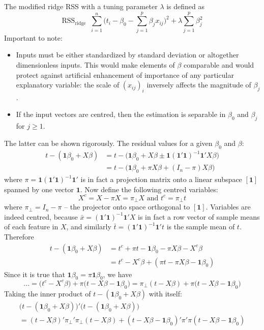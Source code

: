 \documentclass[a4paper]{article}
\newcommand{\RSS}{\text{RSS}}
\newcommand{\one}{\mathbf{1}}
\newcommand{\defn}{\mathop{\overset{\Delta}{=}}\nolimits}
\begin{document}
The modified ridge RSS with a tuning parameter $\lambda$ is defined as
\[
\RSS_\text{ridge}
\defn \sum_{i=1}^n \bigl( t_i - \beta_0 - \sum_{j=1}^p \beta_j x_{ij} \bigr)^2
	+ \lambda \sum_{j=1}^p \beta_j^2
\]
Important to note: \begin{itemize}
	\item Inputs must be either standardized by standard deviation or altogether
	dimensionless inputs. This would make elements of $\beta$ comparable and would
	protect against artificial enhancement of importance of any particular explanatory
	variable: the scale of $(x_{ij})_i$ inversely affects the magnitude of $\beta_j$.
	\item If the input vectors are centred, then the estimation is separable in
	$\beta_0$ and $\beta_j$ for $j\geq 1$.
\end{itemize}
The latter can be shown rigorously. The residual values for a given $\beta_0$
and $\beta$:
\begin{align*}
t-(\one\beta_0 + X\beta)
&= t-\bigl(\one\beta_0 + X\beta \pm \one(\one'\one)^{-1}\one'X\beta \bigr)\\
&= t-\bigl(\one\beta_0 + \pi X\beta + (I_n-\pi)X\beta \bigr)
\end{align*}
where $\pi = \one(\one'\one)^{-1}\one'$ is in fact a projection matrix onto a
linear subspace $[\one]$ spanned by one vector $\one$. Now define the following
centred variables:
\[X^c = X - \pi X = \pi_\perp X \text{ and } t^c = \pi_\perp t\]
where $\pi_\perp = I_n-\pi$ -- the projector onto space orthogonal to $[\one]$.
Variables are indeed centred, because $\bar{x} = (\one'\one)^{-1}\one'X$ is in
fact a row vector of sample means of each feature in $X$, and similarly
$\bar{t} = (\one'\one)^{-1}\one't$ is the sample mean of $t$. Therefore
\begin{align*}
t-(\one\beta_0 + X\beta)
&= t^c + \pi t - \one\beta_0 - \pi X\beta - X^c \beta\\
&= t^c - X^c \beta + (\pi t - \pi X\beta - \one\beta_0)
\end{align*}
Since it is true that $\one\beta_0 = \pi \one\beta_0$, we have
\[
\ldots
= \bigl(t^c - X^c\beta\bigr) + \pi\bigl( t - X\beta - \one\beta_0\bigr)
= \pi_\perp(t - X\beta) + \pi\bigl( t - X\beta - \one\beta_0\bigr)
\]
Taking the inner product of $t-(\one\beta_0 + X\beta)$ with itself:
\begin{multline*}
\bigl(t-(\one\beta_0 + X\beta)\bigr)'\bigl(t-(\one\beta_0 + X\beta)\bigr) \\
= (t - X\beta)'\pi_\perp'\pi_\perp(t - X\beta) + (t - X\beta - \one\beta_0)'\pi'\pi(t - X\beta - \one\beta_0)
\end{multline*}
\end{document}
